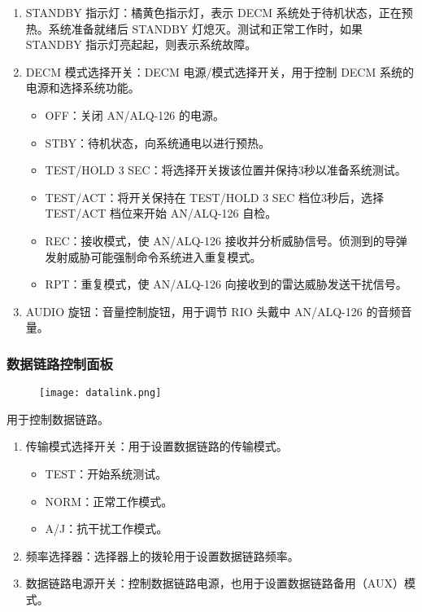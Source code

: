 \begin{enumerate}
	\item STANDBY 指示灯：橘黄色指示灯，表示 DECM 系统处于待机状态，正在预热。系统准备就绪后 STANDBY 灯熄灭。测试和正常工作时，如果 STANDBY 指示灯亮起起，则表示系统故障。
	\item DECM 模式选择开关：DECM 电源/模式选择开关，用于控制 DECM 系统的电源和选择系统功能。
	      \begin{itemize}
		      \item OFF：关闭 AN/ALQ-126 的电源。
		      \item STBY：待机状态，向系统通电以进行预热。
		      \item TEST/HOLD 3 SEC：将选择开关拨该位置并保持3秒以准备系统测试。
		      \item TEST/ACT：将开关保持在 TEST/HOLD 3 SEC 档位3秒后，选择 TEST/ACT 档位来开始 AN/ALQ-126 自检。
		      \item REC：接收模式，使 AN/ALQ-126 接收并分析威胁信号。侦测到的导弹发射威胁可能强制命令系统进入重复模式。
		      \item RPT：重复模式，使 AN/ALQ-126 向接收到的雷达威胁发送干扰信号。
	      \end{itemize}
	\item AUDIO 旋钮：音量控制旋钮，用于调节 RIO 头戴中 AN/ALQ-126 的音频音量。
\end{enumerate}

\subsubsection{数据链路控制面板}
\begin{figure}[htb]
	\centering
	\texttt{[image: datalink.png]}
\end{figure}
用于控制数据链路。

\begin{enumerate}
	\item 传输模式选择开关：用于设置数据链路的传输模式。
	      \begin{itemize}
		      \item TEST：开始系统测试。
		      \item NORM：正常工作模式。
		      \item A/J：抗干扰工作模式。
	      \end{itemize}
	\item 频率选择器：选择器上的拨轮用于设置数据链路频率。
	\item 数据链路电源开关：控制数据链路电源，也用于设置数据链路备用（AUX）模式。
\end{enumerate}

